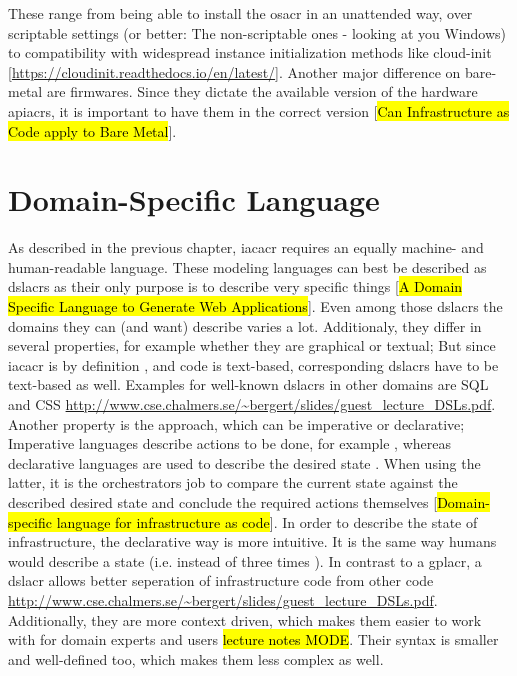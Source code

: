 These range from being able to install the \gls{osacr} in an unattended way, over scriptable settings (or better: The non-scriptable ones - looking at you Windows) to compatibility with widespread instance initialization methods like cloud-init [\url{https://cloudinit.readthedocs.io/en/latest/}].
\newline
Another major difference on bare-metal are firmwares. Since they dictate the available version of the hardware \gls{apiacr}s, it is important to have them in the correct version [\hl{Can Infrastructure as Code apply to Bare Metal}].



\section{Domain-Specific Language} %
As described in the previous chapter, \gls{iacacr} requires an equally machine- and human-readable language. These modeling languages can best be described as \gls{dslacr}s as their only purpose is to describe very specific things [\hl{A Domain Specific Language to Generate Web Applications}]. Even among those \gls{dslacr}s the domains they can (and want) describe varies a lot. Additionaly, they differ in several properties, for example whether they are graphical or textual; But since \gls{iacacr} is by definition , and code is text-based, corresponding \gls{dslacr}s have to be text-based as well. Examples for well-known \gls{dslacr}s in other domains are SQL and CSS \url{http://www.cse.chalmers.se/~bergert/slides/guest_lecture_DSLs.pdf}.
Another property is the approach, which can be imperative or declarative; Imperative languages describe actions to be done, for example , whereas declarative languages are used to describe the desired state . When using the latter, it is the orchestrators job to compare the current state against the described desired state and conclude the required actions themselves [\hl{Domain-specific language for infrastructure as code}].
In order to describe the state of infrastructure, the declarative way is more intuitive. It is the same way humans would describe a state (i.e.  instead of three times ).
\newline
In contrast to a \gls{gplacr}, a \gls{dslacr} allows better seperation of infrastructure code from other code \url{http://www.cse.chalmers.se/~bergert/slides/guest_lecture_DSLs.pdf}. Additionally, they are more context driven, which makes them easier to work with for domain experts and users \hl{lecture notes MODE}. Their syntax is smaller and well-defined too, which makes them less complex as well.
\newline

